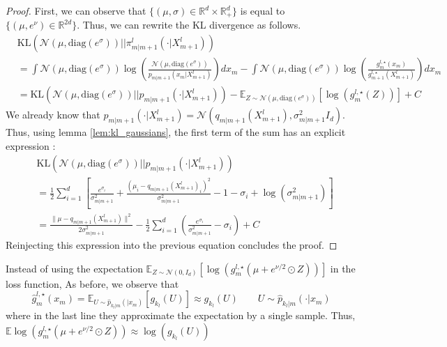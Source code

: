 \documentclass[12pt]{article}
\begin{document}
\begin{proof}
    First, we can observe that $\{(\mu, \sigma) \in \mathbb{R}^d \times \mathbb{R}_+^d\}$
    is equal to $\{(\mu, e^\nu) \in \mathbb{R}^{2d}\}$.
    Thus, we can rewrite the KL divergence as follows.
\begin{align*}
    & \text{KL} \left( \mathcal{N} \left(\mu, \text{diag}(e^\sigma) \right) || \pi^l_{m|m+1}(\cdot | X_{m+1}^l)\right) \\
    & =
    \int \mathcal{N}(\mu, \text{diag}(e^\sigma)) \log\left(\frac{\mathcal{N}(\mu, \text{diag}(e^\sigma))}
    {p_{m|m+1}(x_m|X_{m+1}^l)}\right) dx_m
    - \int \mathcal{N}(\mu, \text{diag}(e^\sigma)) \log(\frac{g_m^{l,\star}(x_m)}{g_{m+1}^{l,\star}(X_{m+1}^l)}) dx_m \\
    &= \text{KL} \left( \mathcal{N}(\mu, \text{diag}(e^\sigma)) || p_{m|m+1}(\cdot|X_{m+1}^l)\right)
     - \mathbb{E}_{Z \sim \mathcal{N}(\mu, \text{diag}(e^\sigma))} 
    \left[ \log(g_m^{l,\star}(Z)) \right] + C
\end{align*}
We already know that $p_{m|m+1}(\cdot|X^l_{m+1}) = \mathcal{N}(q_{m|m+1}(X^l_{m+1}), \sigma_{m|m+1}^2 I_d)$.
Thus, using lemma \ref{lem:kl_gaussians}, the first term of the sum has an explicit expression : 
\begin{align*}
    & \text{KL} \left( \mathcal{N}(\mu, \text{diag}(e^\sigma)) || p_{m|m+1}(\cdot|X_{m+1}^l)\right) \\
    & = \frac{1}{2} \sum_{i=1}^d \left[ 
    \frac{e^{\sigma_i}}{\sigma_{m|m+1}^2} + \frac{(\mu_i - q_{m|m+1}(X^l_{m+1})_i)^2}{\sigma_{m|m+1}^2}
    - 1 - \sigma_i + \log(\sigma_{m|m+1}^2) \right] \\
    &= \frac{\| \mu - q_{m|m+1}(X^l_{m+1})\|^2}{2 \sigma_{m|m+1}^2} 
    - \frac{1}{2}\sum_{i=1}^d \left(\frac{e^{\sigma_i}}{\sigma_{m|m+1}^2} - \sigma_i \right) + C
\end{align*}
Reinjecting this expression into the previous equation concludes the proof.
\end{proof}
Instead of using the expectation $\mathbb{E}_{Z \sim \mathcal{N}(0, I_d)}
\left[ \log(g_m^{l,\star}(\mu + e^{\nu/2} \odot Z)) \right]$ in the loss function, 
As before, we observe that
\begin{equation}
    \hat{g}_m^{l, \star}(x_m) 
    = \mathbb{E}_{U \sim \hat{p}_{k_l|m}(|x_m)} \left[ g_{k_l}(U) \right]
    \approx g_{k_l}(U) \quad \quad U \sim \hat{p}_{k_l|m}(\cdot|x_m)
\end{equation}
where in the last line they approximate the expectation by a single sample.
Thus, $\mathbb{E} \log(g_m^{l,\star}(\mu + e^{\nu/2} \odot Z)) \approx \log(g_{k_l}(U))$ 
\end{document}
